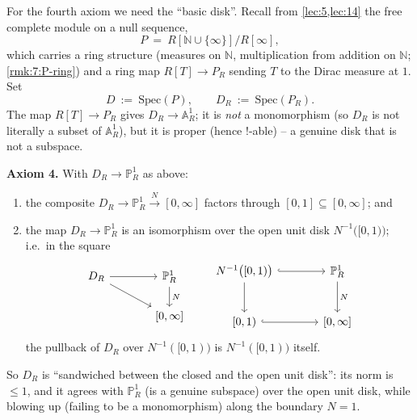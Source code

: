 For the fourth axiom we need the ``basic disk''. Recall from
\cref{lec:5,lec:14} the free complete module on a null sequence,
\begin{equation*}
P\ =\ R[\mathbb N\cup\{\infty\}]/R[\infty],
\end{equation*}
which carries a ring structure (measures on $\mathbb N$, multiplication from
addition on $\mathbb N$; \cref{rmk:7:P-ring}) and a ring map $R[T]\to P_R$
sending $T$ to the Dirac measure at $1$. Set
\begin{equation*}
D\ :=\ \mathrm{Spec}(P),\qquad D_R\ :=\ \mathrm{Spec}(P_R).
\end{equation*}
The map $R[T]\to P_R$ gives $D_R\to\mathbb A^1_R$; it is \emph{not} a
monomorphism (so $D_R$ is not literally a subset of $\mathbb A^1_R$), but it is
proper (hence $!$-able) -- a genuine disk that is not a subspace.

\textbf{Axiom 4.} With $D_R\to\mathbb P^1_R$ as above:
\begin{enumerate}
\item[(4a)] the composite $D_R\to\mathbb P^1_R\xrightarrow{N}[0,\infty]$ factors
through $[0,1]\subseteq[0,\infty]$; and
\item[(4b)] the map $D_R\to\mathbb P^1_R$ is an isomorphism over the open unit
disk $N^{-1}\bigl([0,1)\bigr)$; i.e.\ in the square
\begin{equation*}
\begin{tikzcd}[column sep=large]
D_R \arrow[r] \arrow[rd] & \mathbb P^1_R \arrow[d, "N"] \\
& {[0,\infty]}
\end{tikzcd}
\qquad
\begin{tikzcd}[column sep=large, row sep=large]
N^{-1}\bigl([0,1)\bigr) \arrow[r, hook] \arrow[d] & \mathbb P^1_R
\arrow[d, "N"] \\
{[0,1)} \arrow[r, hook] & {[0,\infty]}
\end{tikzcd}
\end{equation*}
the pullback of $D_R$ over $N^{-1}([0,1))$ is $N^{-1}([0,1))$ itself.
\end{enumerate}

So $D_R$ is ``sandwiched between the closed and the open unit disk'': its norm is
$\le 1$, and it agrees with $\mathbb P^1_R$ (is a genuine subspace) over the open
unit disk, while blowing up (failing to be a monomorphism) along the boundary
$N=1$.

